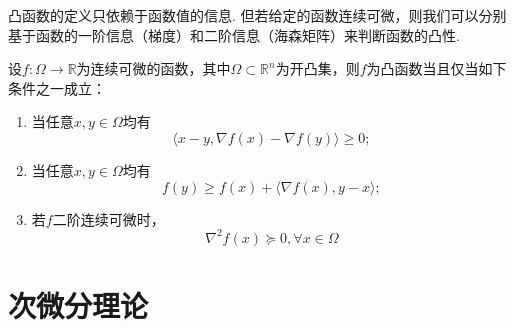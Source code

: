 凸函数的定义只依赖于函数值的信息. 但若给定的函数连续可微，则我们可以分别基于函数的一阶信息（梯度）和二阶信息（海森矩阵）来判断函数的凸性.
\begin{theorem}
    设$f:\Omega\to \mathbb{R}$为连续可微的函数，其中$\Omega\subset \mathbb{R}^n$为开凸集，则$f$为凸函数当且仅当如下条件之一成立：
    \begin{enumerate}
        \item 当任意$x,y\in\Omega$均有
        \begin{equation}\label{eq:convexSetEquivalence1}
            \langle x-y,\nabla f(x)-\nabla f(y)\rangle\geq0;
        \end{equation}
        \item 当任意$x,y\in\Omega$均有
        \begin{equation}\label{eq:convexSetEquivalence2}
            f(y)\geq f(x)+\langle\nabla f(x),y-x\rangle;
        \end{equation}
        \item 若$f$二阶连续可微时，
        \begin{equation}\label{eq:convexSetEquivalence3}
            \nabla^2f(x)\succeq 0,\forall x\in \Omega
        \end{equation}
    \end{enumerate} 
\end{theorem}
\section{次微分理论}
